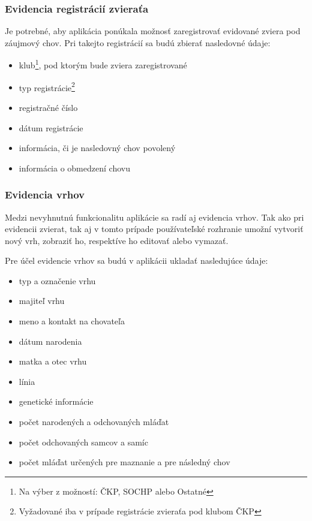 \subsubsection{Evidencia registrácií zvieraťa}\label{evidencia-registracii-zvierata}
Je potrebné, aby aplikácia ponúkala možnosť zaregistrovať evidované zviera pod záujmový chov.
Pri takejto registrácií sa budú zbierať nasledovné údaje:

\begin{itemize}
	\item klub\footnote{Na výber z možností: ČKP, SOCHP alebo Ostatné}, pod ktorým bude zviera zaregistrované
	\item typ registrácie\footnote{Vyžadované iba v prípade registrácie zvieraťa pod klubom ČKP}
	\item registračné číslo
	\item dátum registrácie
	\item informácia, či je nasledovný chov povolený
	\item informácia o obmedzení chovu
\end{itemize}

\subsubsection{Evidencia vrhov}
Medzi nevyhnutnú funkcionalitu aplikácie sa radí aj evidencia vrhov. Tak ako pri evidencii zvierat, tak aj v tomto prípade používateľské rozhranie umožní vytvoriť nový vrh, zobraziť ho, respektíve ho editovať alebo vymazať. 

\hfill \break
Pre účel evidencie vrhov sa budú v aplikácii ukladať nasledujúce údaje:

\begin{itemize}
	\item typ a označenie vrhu
	\item majiteľ vrhu
	\item meno a kontakt na chovateľa
	\item dátum narodenia
	\item matka a otec vrhu
	\item línia
	\item genetické informácie
	\item počet narodených a odchovaných mláďat
	\item počet odchovaných samcov a samíc
	\item počet mláďat určených pre maznanie a pre následný chov
\end{itemize}

